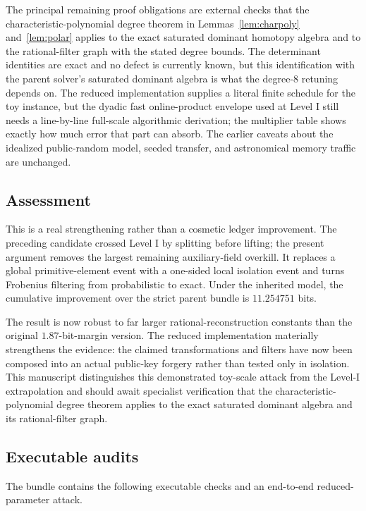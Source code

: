 \documentclass[11pt,a4paper]{article}
\theoremstyle{definition}
\theoremstyle{remark}
\begin{document}
The principal remaining proof obligations are external checks that the characteristic-polynomial degree theorem in Lemmas~\ref{lem:charpoly} and~\ref{lem:polar} applies to the exact saturated dominant homotopy algebra and to the rational-filter graph with the stated degree bounds.  The determinant identities are exact and no defect is currently known, but this identification with the parent solver's saturated dominant algebra is what the degree-$8$ retuning depends on.  The reduced implementation supplies a literal finite schedule for the toy instance, but the dyadic fast online-product envelope used at Level I still needs a line-by-line full-scale algorithmic derivation; the multiplier table shows exactly how much error that part can absorb.  The earlier caveats about the idealized public-random model, seeded transfer, and astronomical memory traffic are unchanged.

\subsection{Assessment}

This is a real strengthening rather than a cosmetic ledger improvement.  The preceding candidate crossed Level I by splitting before lifting; the present argument removes the largest remaining auxiliary-field overkill.  It replaces a global primitive-element event with a one-sided local isolation event and turns Frobenius filtering from probabilistic to exact.  Under the inherited model, the cumulative improvement over the strict parent bundle is $11.254751$ bits.

The result is now robust to far larger rational-reconstruction constants than the original $1.87$-bit-margin version.  The reduced implementation materially strengthens the evidence: the claimed transformations and filters have now been composed into an actual public-key forgery rather than tested only in isolation.  This manuscript distinguishes this demonstrated toy-scale attack from the Level-I extrapolation and should await specialist verification that the characteristic-polynomial degree theorem applies to the exact saturated dominant algebra and its rational-filter graph.

\subsection{Executable audits}\label{sec:audits-new}
The bundle contains the following executable checks and an end-to-end reduced-parameter attack.
\end{document}
